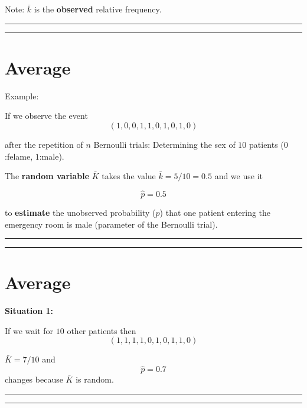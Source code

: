 \documentclass[
]{book}
\begin{document}
Note: \(\bar{k}\) is the \textbf{observed} relative frequency.

\begin{center}\rule{0.5\linewidth}{0.5pt}\end{center}

\begin{center}\rule{0.5\linewidth}{0.5pt}\end{center}

\hypertarget{average-4}{%
\section{Average}\label{average-4}}

Example:

If we observe the event \[(1, 0, 0, 1, 1, 0, 1, 0, 1, 0)\]

after the repetition of \(n\) Bernoulli trials: Determining the sex of \(10\) patients (\(0\):felame, \(1\):male).

The \textbf{random variable} \(\bar{K}\) takes the value \(\bar{k}= 5/10=0.5\) and we use it

\[\hat{p}=0.5\]

to \textbf{estimate} the unobserved probability (\(p\)) that one patient entering the emergency room is male (parameter of the Bernoulli trial).

\begin{center}\rule{0.5\linewidth}{0.5pt}\end{center}

\begin{center}\rule{0.5\linewidth}{0.5pt}\end{center}

\hypertarget{average-5}{%
\section{Average}\label{average-5}}

\textbf{Situation 1:}

If we wait for \(10\) other patients then \[(1, 1, 1, 1, 0, 1, 0, 1, 1, 0)\]

\(\bar{K}=7/10\) and \[\hat{p}=0.7\] changes because \(\bar{K}\) is random.

\begin{center}\rule{0.5\linewidth}{0.5pt}\end{center}

\begin{center}\rule{0.5\linewidth}{0.5pt}\end{center}
\end{document}

